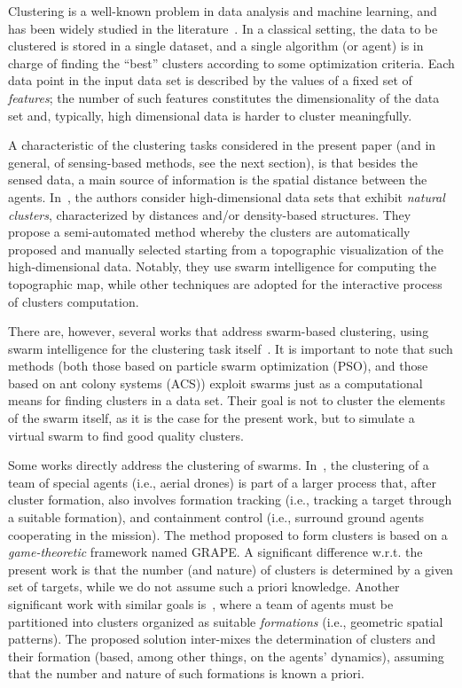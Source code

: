 Clustering is a well-known problem in data analysis and machine learning, 
 and has been widely studied in the literature~\cite{Jain:1999,DBLP:journals/sigkdd/Estivill-Castro02,Jain:2010}.
In a classical setting, the data to be clustered is stored in a single dataset, and a single algorithm (or agent) is in charge of finding the ``best'' clusters according to some optimization criteria.
 Each data point in the input data set is described by the values of a fixed set of {\em features}; 
 the number of such features constitutes the dimensionality of the data set and, typically, high dimensional data is harder to cluster meaningfully.

A characteristic of the clustering tasks considered in the present paper (and in general, of sensing-based methods, see the next section), 
 is that besides the sensed data,
 a main source of information is the spatial distance between the agents. 
 In~\cite{Thrun:2021}, the authors consider high-dimensional data sets that exhibit {\em natural clusters}, characterized by distances and/or density-based structures.
 They propose a semi-automated method whereby the clusters are automatically proposed and manually selected starting from a topographic visualization of the high-dimensional data.
 Notably, they use swarm intelligence for computing the topographic map, 
 while other techniques are adopted for the interactive process of clusters computation.

There are, however, several works that address swarm-based clustering, 
 using swarm intelligence for the clustering task itself~\cite{Martens:2011}.
 It is important to note that such methods (both those based on particle swarm optimization (PSO), and those based on ant colony systems (ACS)) exploit swarms just as a computational means for finding clusters in a data set.
 Their goal is not to cluster the elements of the swarm itself, 
  as it is the case for the present work, but to simulate a virtual swarm to find good quality clusters.

Some works directly address the clustering of swarms. 
 In~\cite{DBLP:journals/trob/HuBJAL21}, the clustering of a team of special agents (i.e., aerial drones) is part of a larger process that,
 after cluster formation, also involves formation tracking (i.e., tracking a target through a suitable formation), and containment control (i.e., surround ground agents cooperating in the mission).
 The method proposed to form clusters is based on a \emph{game-theoretic} framework named GRAPE. 
 A significant difference w.r.t. the present work is that the number (and nature) of clusters is determined by a given set of targets,
 while we do not assume such a priori knowledge.
Another significant work with similar goals is~\cite{DBLP:journals/tie/GeHZ18}, 
 where a team of agents must be partitioned into clusters organized as suitable {\em formations} (i.e., geometric spatial patterns).
 The proposed solution inter-mixes the determination of clusters and their formation (based, among other things, on the agents' dynamics), 
 assuming that the number and nature of such formations is known a priori.

